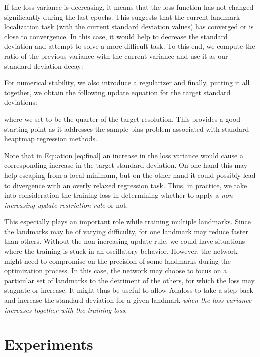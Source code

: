 \documentclass[10pt,twocolumn,letterpaper]{article}
\begin{document}
If the loss variance is decreasing, it means that the loss function has not changed significantly during the last  epochs. This suggests that the current landmark localization task (with the current standard deviation values) has converged or is close to convergence. In this case, it would help to decrease the standard deviation and attempt to solve a more difficult task. To this end, we compute the ratio of the previous variance  with the current variance  and use it as our standard deviation decay:


For numerical stability, we also introduce a regularizer  and finally, putting it all together, we obtain the following update equation for the target standard deviations:

where we set  to be the quarter of the target resolution. This provides a good starting point as it addresses the sample bias problem
associated with standard heaptmap regression methods.



Note that in Equation \ref{eq:final} an increase in the loss variance would cause a corresponding increase in the target standard deviation. On one hand this may help escaping from a local minimum, but on the other hand it could possibly lead to divergence with an overly relaxed regression task. Thus, in practice, we take into consideration the training loss in determining whether to apply a \textit{non-increasing update restriction rule} or not. 

This especially plays an important role while training multiple landmarks. Since the landmarks may be of varying difficulty,  for one landmark may reduce faster than others. Without the non-increasing update rule, we could have situations where the training is stuck in an oscillatory behavior. However, the network might need to compromise on the precision of some landmarks during the optimization process. In this case, the network may choose to focus on a particular set of landmarks to the detriment of the others, for which the loss may stagnate or increase. It might thus be useful to allow Adaloss to take a step back and increase the standard deviation for a given landmark \textit{when the loss variance increases together with the training loss}. 



 

\section{Experiments}
\end{document}
